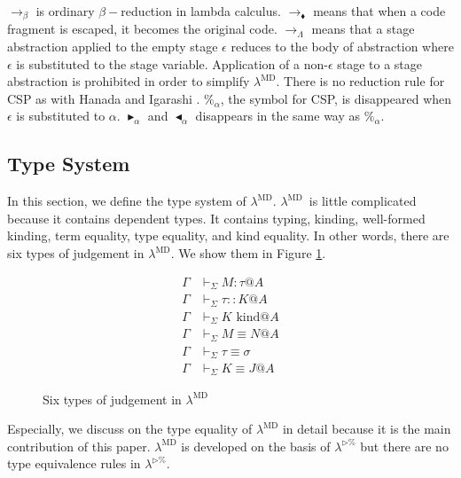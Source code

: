 \documentclass[runningheads]{llncs}
\newcommand{\LTP}{$\lambda^{\triangleright\%}$\xspace}
\newcommand{\LMD}{$\lambda^{\textrm{MD}}$\xspace}
\newcommand{\G}{\Gamma}
\newcommand{\V}{\vdash_\Sigma}
\newcommand{\iskind}{\text{\ kind}}
\newcommand{\TB}{\blacktriangleright}
\newcommand{\TBL}{\blacktriangleleft}
\newcommand{\E}{\equiv}
\begin{document}
  $\longrightarrow_\beta$ is ordinary $\beta-$reduction in lambda calculus.
  $\longrightarrow_\blacklozenge$ means that when a code fragment is escaped, it becomes the original code.
  $\longrightarrow_\Lambda$ means that a stage abstraction applied to the empty stage $\epsilon$ reduces to the body of abstraction
  where $\epsilon$ is substituted to the stage variable.
  Application of a non-$\epsilon$ stage to a stage abstraction is prohibited in order to simplify \LMD.
  There is no reduction rule for CSP as with Hanada and Igarashi \cite{Hanada2014}.
  $\%_\alpha$, the symbol for CSP, is disappeared when $\epsilon$ is substituted to $\alpha$.
  $\TB_\alpha$ and $\TBL_\alpha$ disappears in the same way as $\%_\alpha$.

  \subsection{Type System}


  In this section, we define the type system of \LMD.
  \LMD\ is little complicated because it contains dependent types.
  It contains typing, kinding, well-formed kinding, term equality, type equality, and kind equality.
  In other words, there are six types of judgement in \LMD.
  We show them in Figure \ref{fig:LMD-six-judgements}.

  \begin{figure}
      \begin{center}
          \begin{align*}
              \G & \V M : \tau @ A   \\
              \G & \V \tau :: K @ A  \\
              \G & \V K \iskind @ A  \\
              \G & \V M \E N @ A     \\
              \G & \V \tau \E \sigma \\
              \G & \V K \E J @ A     
          \end{align*}
          \caption{Six types of judgement in \LMD}
          \label{fig:LMD-six-judgements}
      \end{center}
  \end{figure}

  Especially, we discuss on the type equality of \LMD in detail
  because it is the main contribution of this paper.
  \LMD is developed on the basis of \LTP but there are no type equivalence rules in \LTP.
\end{document}
